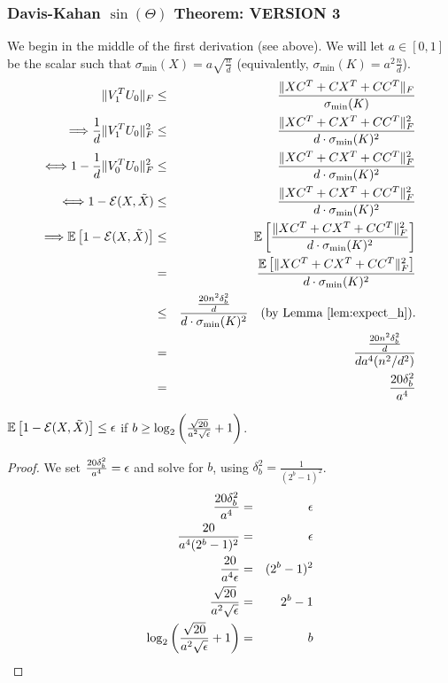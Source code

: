 \subsubsection{Davis-Kahan $\sin(\Theta)$ Theorem: VERSION 3}
We begin in the middle of the first derivation (see above).
We will let $a\in [0,1]$ be the scalar such that $\sigma_{\min}(X) = a \sqrt{\frac{n}{d}}$ (equivalently, $\sigma_{\min}(K) = a^2 \frac{n}{d}$).
\begin{eqnarray*}
	\|V_1^T U_0\|_F	&\leq& \frac{ \|XC^T + CX^T + CC^T\|_F}{\sigma_{\min}(K)} \\
	\Longrightarrow \frac{1}{d}	\|V_1^T U_0\|_F^2 &\leq& \frac{ \|XC^T + CX^T + CC^T\|_F^2}{d \cdot \sigma_{\min}(K)^2} \\
	\Longleftrightarrow 1-\frac{1}{d}\|V_0^T U_0\|_F^2 &\leq&  \frac{ \|XC^T + CX^T + CC^T\|_F^2}{d \cdot \sigma_{\min}(K)^2} \\
	\Longleftrightarrow 1-\eigover(X,\tX) &\leq&  \frac{ \|XC^T + CX^T + CC^T\|_F^2}{d \cdot \sigma_{\min}(K)^2} \\
	\Longrightarrow \expect{}{1-\eigover(X,\tX)} &\leq&  \expect{}{\frac{ \|XC^T + CX^T + CC^T\|_F^2}{d \cdot \sigma_{\min}(K)^2}} \\
	&=&  \frac{ \expect{}{\|XC^T + CX^T + CC^T\|_F^2}}{d \cdot \sigma_{\min}(K)^2}\\
	&\leq& \frac{\frac{20n^2\delta_b^2}{d}}{d \cdot \sigma_{\min}(K)^2} \quad \text{(by Lemma~\ref{lem:expect_h}).} \\
	&=& \frac{\frac{20n^2\delta_b^2}{d}}{d a^4 (n^2/d^2)} \\
	&=& \frac{20 \delta_b^2}{a^4}
\end{eqnarray*}

\begin{corollary}
$\expect{}{1-\eigover(X,\tX)} \leq \eps$ if $b \geq \log_2\bigg(\frac{\sqrt{20}}{a^2\sqrt{\eps}}+1\bigg)$.
\end{corollary}
\begin{proof}
	We set $\frac{20 \delta_b^2}{a^4} = \eps$ and solve for $b$, using $\delta_b^2 = \frac{1}{(2^b-1)^2}$.
\begin{eqnarray*}
	\frac{20 \delta_b^2}{a^4} &=& \eps \\
	\frac{20}{a^4(2^b-1)^2} &=& \eps \\
	\frac{20}{a^4\eps} &=& (2^b-1)^2 \\
	\frac{\sqrt{20}}{a^2\sqrt{\eps}} &=& 2^b-1 \\
	\log_2\bigg(\frac{\sqrt{20}}{a^2\sqrt{\eps}} + 1\bigg) &=& b \\
\end{eqnarray*}
\end{proof}

